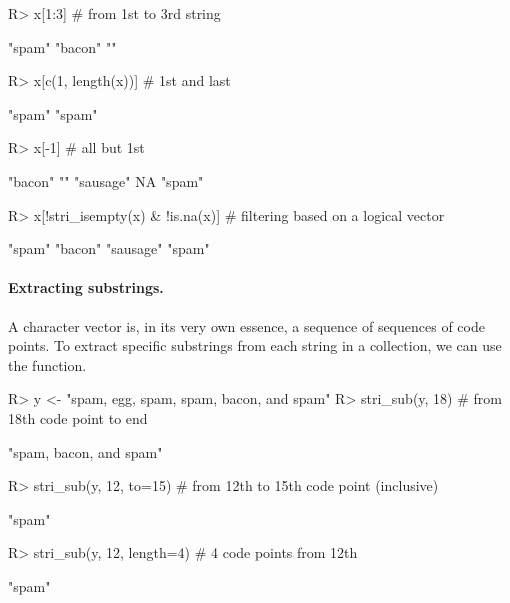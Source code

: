 \documentclass[nojss]{jss}\usepackage[]{graphicx}\usepackage[]{color}
\begin{document}
\begin{Schunk}
\begin{Sinput}
R> x[1:3]                           # from 1st to 3rd string
\end{Sinput}
\begin{Soutput}
[1] "spam"  "bacon" ""
\end{Soutput}
\begin{Sinput}
R> x[c(1, length(x))]               # 1st and last
\end{Sinput}
\begin{Soutput}
[1] "spam" "spam"
\end{Soutput}
\begin{Sinput}
R> x[-1]                            # all but 1st
\end{Sinput}
\begin{Soutput}
[1] "bacon"   ""        "sausage" NA        "spam"
\end{Soutput}
\begin{Sinput}
R> x[!stri_isempty(x) & !is.na(x)]  # filtering based on a logical vector
\end{Sinput}
\begin{Soutput}
[1] "spam"    "bacon"   "sausage" "spam"
\end{Soutput}
\end{Schunk}

\paragraph{Extracting substrings.}
A character vector is, in its very own essence, a sequence of
sequences of code points.
To extract specific substrings from each string in a collection,
we can use the  function.

\begin{Schunk}
\begin{Sinput}
R> y <- "spam, egg, spam, spam, bacon, and spam"
R> stri_sub(y, 18)            # from 18th code point to end
\end{Sinput}
\begin{Soutput}
[1] "spam, bacon, and spam"
\end{Soutput}
\begin{Sinput}
R> stri_sub(y, 12, to=15)     # from 12th to 15th code point (inclusive)
\end{Sinput}
\begin{Soutput}
[1] "spam"
\end{Soutput}
\begin{Sinput}
R> stri_sub(y, 12, length=4)  # 4 code points from 12th
\end{Sinput}
\begin{Soutput}
[1] "spam"
\end{Soutput}
\end{Schunk}
\end{document}
